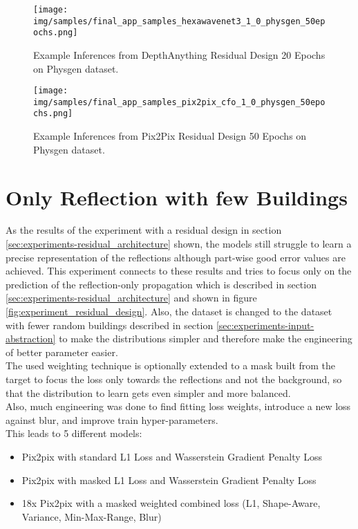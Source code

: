 		\begin{figure}[H]
			\centering
			\texttt{[image: img/samples/final\_app\_samples\_hexawavenet3\_1\_0\_physgen\_50epochs.png]}
			\caption[Example Inferences from DepthAnything Residual Design 20 Epochs on Physgen dataset.]{Example Inferences from DepthAnything Residual Design 20 Epochs on Physgen dataset.}
			\label{fig:experiment_residual_depthanything_examples}
		\end{figure}
		\FloatBarrier
		
		\begin{figure}[H]
			\centering
			\texttt{[image: img/samples/final\_app\_samples\_pix2pix\_cfo\_1\_0\_physgen\_50epochs.png]}
			\caption[Example Inferences from Pix2Pix Residual Design 50 Epochs on Physgen dataset.]{Example Inferences from Pix2Pix Residual Design 50 Epochs on Physgen dataset.}
			\label{fig:experiment_residual_pix2pix_examples}
		\end{figure}
		\FloatBarrier
		
	\clearpage
	
	\section{Only Reflection with few Buildings}
	\label{sec:experiments-only_reflections_with_few_buildings}
		As the results of the experiment with a residual design in section \ref{sec:experiments-residual_architecture} shown, the models still struggle to learn a precise representation of the reflections although part-wise good error values are achieved. This experiment connects to these results and tries to focus only on the prediction of the reflection-only propagation which is described in section \ref{sec:experiments-residual_architecture} and shown in figure \ref{fig:experiment_residual_design}. Also, the dataset is changed to the dataset with fewer random buildings described in section \ref{sec:experiments-input-abstraction} to make the distributions simpler and therefore make the engineering of better parameter easier.\\
		The used weighting technique is optionally extended to a mask built from the target to focus the loss only towards the reflections and not the background, so that the distribution to learn gets even simpler and more balanced.\\
		Also, much engineering was done to find fitting loss weights, introduce a new loss against blur, and improve train hyper-parameters. \\
		This leads to 5 different models:
		\begin{itemize}[itemsep=1mm, parsep=0pt]
			\item Pix2pix with standard L1 Loss and Wasserstein Gradient Penalty Loss
			\item Pix2pix with masked L1 Loss and Wasserstein Gradient Penalty Loss
			\item 18x Pix2pix with a masked weighted combined loss (L1, Shape-Aware, Variance, Min-Max-Range, Blur)
		\end{itemize}
		

